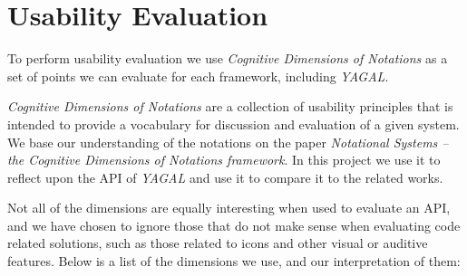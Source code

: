 \section{Usability Evaluation}\label{sec:vocab}
To perform usability evaluation we use \textit{Cognitive Dimensions of Notations} as a set of points we can evaluate for each framework, including \textit{YAGAL}.

\textit{Cognitive Dimensions of Notations} are a collection of usability principles that is intended to provide a vocabulary for discussion and evaluation of a given system. We base our understanding of the notations on the paper \textit{Notational Systems – the Cognitive Dimensions of Notations framework}\cite{cogDimUsage}. In this project we use it to reflect upon the API of \textit{YAGAL} and use it to compare it to the related works.

Not all of the dimensions are equally interesting when used to evaluate an API, and we have chosen to ignore those that do not make sense when evaluating code related solutions, such as those related to icons and other visual or auditive features. Below is a list of the dimensions we use, and our interpretation of them:

